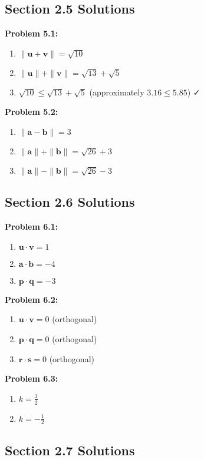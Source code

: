 \documentclass{article}
\begin{document}
\subsection{Section 2.5 Solutions}

\textbf{Problem 5.1:}
\begin{enumerate}
\item $\|\mathbf{u} + \mathbf{v}\| = \sqrt{10}$
\item $\|\mathbf{u}\| + \|\mathbf{v}\| = \sqrt{13} + \sqrt{5}$
\item $\sqrt{10} \leq \sqrt{13} + \sqrt{5}$ (approximately $3.16 \leq 5.85$) ✓
\end{enumerate}

\textbf{Problem 5.2:}
\begin{enumerate}
\item $\|\mathbf{a} - \mathbf{b}\| = 3$
\item $\|\mathbf{a}\| + \|\mathbf{b}\| = \sqrt{26} + 3$
\item $\|\mathbf{a}\| - \|\mathbf{b}\| = \sqrt{26} - 3$
\end{enumerate}

\subsection{Section 2.6 Solutions}

\textbf{Problem 6.1:}
\begin{enumerate}
\item $\mathbf{u} \cdot \mathbf{v} = 1$
\item $\mathbf{a} \cdot \mathbf{b} = -4$
\item $\mathbf{p} \cdot \mathbf{q} = -3$
\end{enumerate}

\textbf{Problem 6.2:}
\begin{enumerate}
\item $\mathbf{u} \cdot \mathbf{v} = 0$ (orthogonal)
\item $\mathbf{p} \cdot \mathbf{q} = 0$ (orthogonal)
\item $\mathbf{r} \cdot \mathbf{s} = 0$ (orthogonal)
\end{enumerate}

\textbf{Problem 6.3:}
\begin{enumerate}
\item $k = \frac{3}{2}$
\item $k = -\frac{1}{2}$
\end{enumerate}

\subsection{Section 2.7 Solutions}
\end{document}
